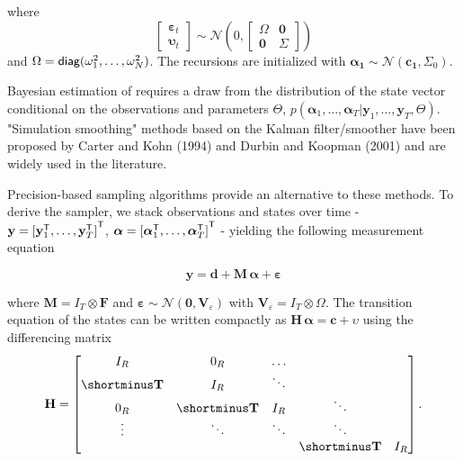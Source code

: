 \documentclass[notitlepage,a4paper,12pt]{article}
\newcommand{\transpose}[1]{{#1}^{\sf{T}}}
\begin{document}
where 
$$
\begin{bmatrix}
    \boldsymbol{\varepsilon}_t \\
    \boldsymbol{\upsilon}_t
\end{bmatrix}
\sim \mathcal{N}(0,
\begin{bmatrix}
\Omega & \mathbf{0} \\
\mathbf{0} & \Sigma
\end{bmatrix}
)
$$
and $\Omega = \text{\sf{diag}}(\omega^2_{1}, \dots, \omega^2_{N})$. The recursions are initialized with $\boldsymbol{\alpha_1} \sim \mathcal{N}(\mathbf{c_1}, \Sigma_0)$.

Bayesian estimation of  requires a draw from the distribution of the state vector conditional on the observations and parameters $\Theta$, $p(\boldsymbol{\alpha}_1, \dots, \boldsymbol{\alpha}_T | \mathbf{y}_1, \dots, \mathbf{y}_T, \Theta)$. "Simulation smoothing" methods based on the Kalman filter/smoother have been proposed by Carter and Kohn (1994) and Durbin and Koopman (2001) and are widely used in the literature.

Precision-based sampling algorithms \citep{chanjeliazkov_2009} provide an alternative to these methods. To derive the sampler, we stack observations and states over time - $\mathbf{y} = \transpose{[\transpose{\mathbf{y}}_1, \dots, \transpose{\mathbf{y}}_T]}$, $\boldsymbol{\alpha} = \transpose{[\transpose{\boldsymbol{\alpha}}_1, \dots, \transpose{\boldsymbol{\alpha}}_T]}$ - yielding the following measurement equation

\begin{equation}
\mathbf{y} = \mathbf{d} + \mathbf{M} \, \boldsymbol{\alpha} + \boldsymbol{\varepsilon}
\end{equation} 

where $ \mathbf{M} = I_T \otimes \mathbf{F}$ and $\boldsymbol{\varepsilon} \sim \mathcal{N}(\mathbf{0}, \mathbf{V}_{\varepsilon})$ with $\mathbf{V}_{\varepsilon} = I_T \otimes \Omega$. The transition equation of the states can be written compactly as $\mathbf{H}\, \boldsymbol{\alpha} = \mathbf{c} + \upsilon$ using the differencing matrix 
$$
\mathbf{H}
=
\begin{bmatrix}
    I_R & 0_R & \dots \\
    \shortminus \mathbf{T} & I_R & \ddots \\
    0_R & \shortminus \mathbf{T} & I_R & \ddots \\
    \vdots & \ddots & \ddots & \ddots \\
    & & & \shortminus \mathbf{T} & I_R
\end{bmatrix}.
$$
\end{document}
